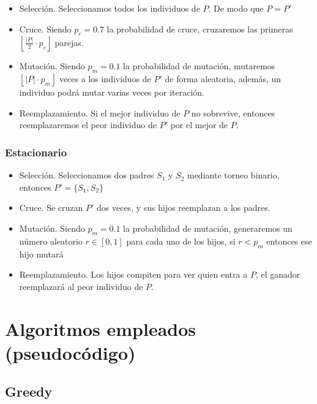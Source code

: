 \documentclass{article}
\begin{document}
    \begin{itemize}
        \item Selección.
        Seleccionamos todos los individuos de $P$. De modo que $P = P'$
        \item Cruce.
        Siendo $p_c = 0.7$ la probabilidad de cruce, cruzaremos las primeras
        $\left\lfloor\frac{|P|}{2}\cdot p_c\right\rfloor$ parejas.
        \item Mutación.
        Siendo $p_m = 0.1$ la probabilidad de mutación, mutaremos
        $\left\lfloor|P|\cdot p_m\right\rfloor$ veces a los individuos de $P'$
        de forma aleatoria, además, un individuo podrá mutar varias veces por
        iteración.
        \item Reemplazamiento.
        Si el mejor individuo de $P$ no sobrevive,
        entonces reemplazaremos el peor individuo de $P'$ por el
        mejor de $P$.
    \end{itemize}

    \subsubsection{Estacionario}

    \begin{itemize}
        \item Selección.
        Seleccionamos dos padres $S_1$ y $S_2$ mediante torneo binario,
        entonces $P' = \{S_1, S_2\}$
        \item Cruce.
        Se cruzan $P'$ dos veces, y sus hijos reemplazan a los padres.
        \item Mutación.
        Siendo $p_m = 0.1$ la probabilidad de mutación, generaremos un
        número aleatorio $r \in [0,1]$ para cada uno de los hijos,
        si $r < p_m$ entonces ese hijo mutará
        \item Reemplazamiento.
        Los hijos compiten para ver quien entra a $P$, el ganador
        reemplazará al peor individuo de $P$.
    \end{itemize}

    \pagebreak
    \section{Algoritmos empleados (pseudocódigo)}

    \subsection{Greedy}
\end{document}
